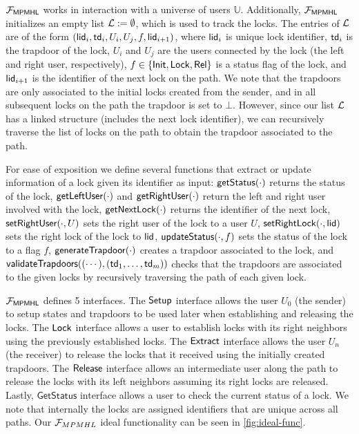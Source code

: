 $\mathcal{F}_{\mathsf{MPMHL}}$ works in interaction with a universe of users $\mathbb{U}$. Additionally, 
$\mathcal{F}_{\mathsf{MPMHL}}$ initializes an empty list $\mathcal{L} := \emptyset$, which is used to track the 
locks. The entries of $\mathcal{L}$ are of the form $(\mathsf{lid}_i, \mathsf{td}_i, U_i, U_j, f, \\ \mathsf{lid}_{i+1})$, 
where $\mathsf{lid}_i$ is unique lock identifier, $\mathsf{td}_i$ is the trapdoor of the lock, $U_i$ and $U_j$ 
are the users connected by the lock (the left and right user, respectively), $f \in \{\mathsf{Init},\mathsf{Lock},
\mathsf{Rel}\}$ is a status flag of the lock, and $\mathsf{lid}_{i+1}$ is the identifier of the next lock on the 
path. We note that the trapdoors are only associated to the initial locks created from the sender, 
and in all subsequent locks on the path the trapdoor is set to $\bot$. However, since our list 
$\mathcal{L}$ has a linked structure (includes the next lock identifier), we can recursively traverse the 
list of locks on the path to obtain the trapdoor associated to the path.

For ease of exposition we define several functions that extract or update information of a 
lock given its identifier as input: $\mathsf{getStatus}(\cdot)$ returns the status of the lock, 
$\mathsf{getLeftUser}(\cdot)$ and $\mathsf{getRightUser}(\cdot)$ return the left and right user involved with the 
lock, $\mathsf{getNextLock}(\cdot)$ returns the identifier of the next lock, $\mathsf{setRightUser}(\cdot, U)$ 
sets the right user of the lock to a user $U$, $\mathsf{setRightLock}(\cdot, \mathsf{lid})$ sets the right lock 
of the lock to $\mathsf{lid}$, $\mathsf{updateStatus}(\cdot, f)$ sets the status of the lock to a flag $f$, 
$\mathsf{generateTrapdoor}(\cdot)$ creates a trapdoor associated to the lock, and $\mathsf{validateTrapdoors}
((\cdots), (\mathsf{td}_1,\ldots,\mathsf{td}_m))$ checks that the trapdoors are associated to the given locks 
by recursively traversing the path of each given lock.

$\mathcal{F}_{\mathsf{MPMHL}}$ defines 5 interfaces. The $\mathsf{Setup}$ interface allows the user $U_0$ (the sender) 
to setup states and trapdoors to be used later when establishing and releasing the locks. The $\mathsf{Lock}$ 
interface allows a user to establish locks with its right neighbors using the previously established 
locks. The $\mathsf{Extract}$ interface allows the user $U_n$ (the receiver) to release the locks that it 
received using the initially created trapdoors. The $\mathsf{Release}$ interface allows an intermediate user 
along the path to release the locks with its left neighbors assuming its right locks are released. 
Lastly, $\mathsf{GetStatus}$ interface allows a user to check the current status of a lock. We note 
that internally the locks are assigned identifiers that are unique across all paths. Our $\mathcal{F}_{MPMHL}$ 
ideal functionality can be seen in \cref{fig:ideal-func}.

